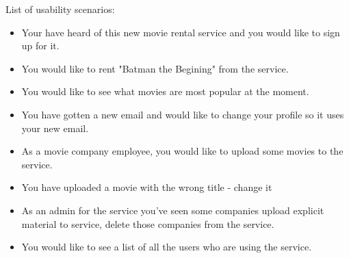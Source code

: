 List of usability scenarios:
\begin{itemize}\addtolength{\itemsep}{-5pt}
\item Your have heard of this new movie rental service and you would like to sign up for it.
\item You would like to rent "Batman the Begining" from the service.
\item You would like to see what movies are most popular at the moment.
\item You have gotten a new email and would like to change your profile so it uses your new email.
\item As a movie company employee, you would like to upload some movies to the service.
\item You have uploaded a movie with the wrong title - change it
\item As an admin for the service you've seen some companies upload explicit material to service, delete those companies from the service.
\item You would like to see a list of all the users who are using the service.
\end {itemize}